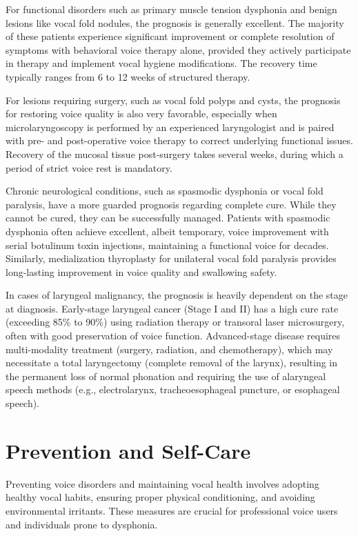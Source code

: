 For functional disorders such as primary muscle tension dysphonia and benign lesions like vocal fold nodules, the prognosis is generally excellent. The majority of these patients experience significant improvement or complete resolution of symptoms with behavioral voice therapy alone, provided they actively participate in therapy and implement vocal hygiene modifications. The recovery time typically ranges from 6 to 12 weeks of structured therapy.

For lesions requiring surgery, such as vocal fold polyps and cysts, the prognosis for restoring voice quality is also very favorable, especially when microlaryngoscopy is performed by an experienced laryngologist and is paired with pre- and post-operative voice therapy to correct underlying functional issues. Recovery of the mucosal tissue post-surgery takes several weeks, during which a period of strict voice rest is mandatory.

Chronic neurological conditions, such as spasmodic dysphonia or vocal fold paralysis, have a more guarded prognosis regarding complete cure. While they cannot be cured, they can be successfully managed. Patients with spasmodic dysphonia often achieve excellent, albeit temporary, voice improvement with serial botulinum toxin injections, maintaining a functional voice for decades. Similarly, medialization thyroplasty for unilateral vocal fold paralysis provides long-lasting improvement in voice quality and swallowing safety.

In cases of laryngeal malignancy, the prognosis is heavily dependent on the stage at diagnosis. Early-stage laryngeal cancer (Stage I and II) has a high cure rate (exceeding 85\% to 90\%) using radiation therapy or transoral laser microsurgery, often with good preservation of voice function. Advanced-stage disease requires multi-modality treatment (surgery, radiation, and chemotherapy), which may necessitate a total laryngectomy (complete removal of the larynx), resulting in the permanent loss of normal phonation and requiring the use of alaryngeal speech methods (e.g., electrolarynx, tracheoesophageal puncture, or esophageal speech).

\section*{Prevention and Self-Care}
Preventing voice disorders and maintaining vocal health involves adopting healthy vocal habits, ensuring proper physical conditioning, and avoiding environmental irritants. These measures are crucial for professional voice users and individuals prone to dysphonia.

